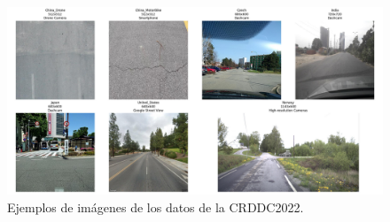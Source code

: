\begin{figure}
    \centering
    \includegraphics[height=\textheight,width=\textwidth,keepaspectratio]{img/example_images_regions.png}
    \caption{Ejemplos de imágenes de los datos de la CRDDC2022.}
    \label{fig:example_images_region_large}
\end{figure}

